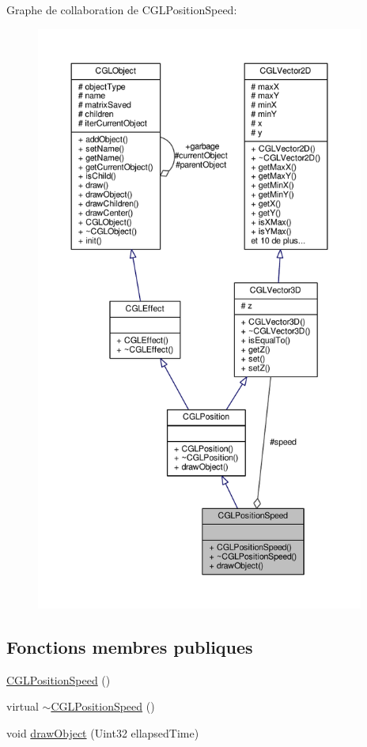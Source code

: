 Graphe de collaboration de C\-G\-L\-Position\-Speed\-:
\nopagebreak
\begin{figure}[H]
\begin{center}
\leavevmode
\includegraphics[height=550pt]{d1/d1b/class_c_g_l_position_speed__coll__graph}
\end{center}
\end{figure}
\subsection*{Fonctions membres publiques}
\begin{DoxyCompactItemize}
\item 
\hyperlink{class_c_g_l_position_speed_a05d2476423f84d0a64ecec45fd7009ab}{C\-G\-L\-Position\-Speed} ()
\item 
virtual \hyperlink{class_c_g_l_position_speed_ae9d03561e39279c943f855747f2de559}{$\sim$\-C\-G\-L\-Position\-Speed} ()
\item 
void \hyperlink{class_c_g_l_position_speed_ac2a548b1df4418be822a62d623fdd1ec}{draw\-Object} (Uint32 ellapsed\-Time)
\end{DoxyCompactItemize}
